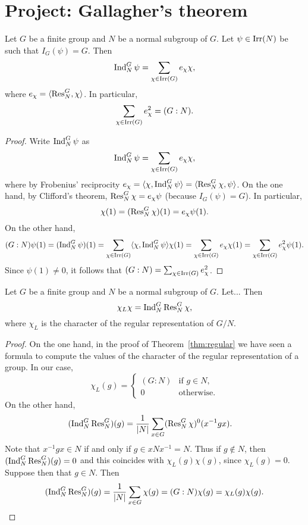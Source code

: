 \section{Project: Gallagher's theorem}

\begin{lemma}
    \label{lem:gallagher1}
    Let $G$ be a finite group and 
    $N$ be a normal subgroup of $G$. Let $\psi\in\operatorname{Irr}(N)$ be such that
    $I_G(\psi)=G$. Then
    \[
    \operatorname{Ind}_N^G\psi=\sum_{\chi\in\operatorname{Irr}(G)}e_\chi\chi,
    \]
    where $e_\chi=\langle\operatorname{Res}_N^G,\chi\rangle$.
    In particular, 
    \[
    \sum_{\chi\in\operatorname{Irr}(G)}e_\chi^2=(G:N).
    \]
\end{lemma}

\begin{proof}
    Write $\operatorname{Ind}_N^G\psi$ as 
    \[
    \operatorname{Ind}_N^G\psi=\sum_{\chi\in\operatorname{Irr}(G)}e_\chi\chi,
    \]
    where by Frobenius' reciprocity $e_\chi=\langle\chi,\operatorname{Ind}_N^G\psi\rangle=\langle\operatorname{Res}_N^G\chi,\psi\rangle$.
    On the one hand, by Clifford's theorem, $\operatorname{Res}_N^G\chi=e_\chi\psi$ (because $I_G(\psi)=G$). In particular, 
    \[
    \chi(1)=(\operatorname{Res}_N^G\chi)(1)=e_\chi\psi(1).
    \]
    On the other hand, 
    \[
    (G:N)\psi(1)=(\operatorname{Ind}_N^G\psi)(1)=\sum_{\chi\in\operatorname{Irr}(G)}\langle\chi,\operatorname{Ind}_N^G\psi\rangle\chi(1)
    =\sum_{\chi\in\operatorname{Irr}(G)}e_\chi\chi(1)
    =\sum_{\chi\in\operatorname{Irr}(G)}e_\chi^2\psi(1).
    \]
    Since $\psi(1)\ne0$, it follows that  $(G:N)=\sum_{\chi\in\operatorname{Irr}(G)}e_\chi^2$. 
\end{proof}

\begin{lemma}
    \label{lem:Gallagher_reg}
    Let $G$ be a finite group and $N$ be a normal subgroup of $G$. Let... Then 
    \[
    \chi_L\chi=\operatorname{Ind}_N^G\operatorname{Res}_N^G\chi,
    \]    
    where $\chi_L$ is the character of the regular representation of $G/N$. 
\end{lemma}

\begin{proof}
    On the one hand, in the proof of Theorem~\ref{thm:regular} we have seen a formula to compute
    the values of the character of the regular representation of a group. In our case, 
    \[
    \chi_L(g)=\begin{cases}
        (G:N) & \text{if $g\in N$},\\
        0 & \text{otherwise}.
    \end{cases}
    \]
    On the other hand, 
    \begin{align*}
        (\operatorname{Ind}_N^G\operatorname{Res}_N^G)(g) &= \frac{1}{|N|}\sum_{x\in G}(\operatorname{Res}_N^G\chi)^0(x^{-1}gx).
    \end{align*}
    Note that $x^{-1}gx\in N$ if and only if $g\in xNx^{-1}=N$. Thus if $g\not\in N$, then
    $(\operatorname{Ind}_N^G\operatorname{Res}_N^G)(g)=0$ and this coincides with $\chi_L(g)\chi(g)$, since $\chi_L(g)=0$. Suppose 
    then that $g\in N$. Then 
    \[
    (\operatorname{Ind}_N^G\operatorname{Res}_N^G)(g)=\frac{1}{|N|}\sum_{x\in G}\chi(g)=(G:N)\chi(g)=\chi_L(g)\chi(g).\qedhere 
    \]
\end{proof}

